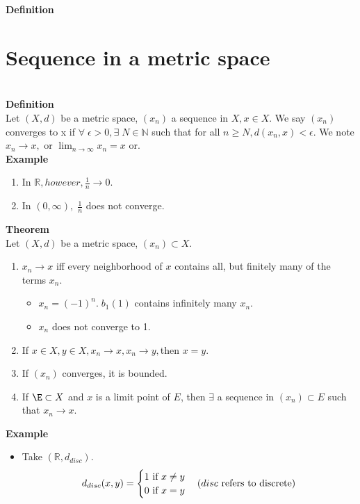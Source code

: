 \documentclass[12pt]{article}
\begin{document}
\begin{block}{\bf Definition}
\newpage
\section{Sequence in a metric space}\\
\textbf{Definition}\\
Let $(X,d)$ be a metric space, $(x_n)$ a sequence in $X, x \in X$. We say $(x_n)$ converges to x if $\forall\;\epsilon > 0, \exists\;N\in \mathbb{N}$ such that  for all $n\ge N, d(x_n,x) < \epsilon$. We note $x_n \rightarrow x,$ or $\lim_{n\rightarrow \infty} x_n = x$ or.\\

\vspace{1\baselineskip}
\textbf{Example}
\begin{enumerate}[label=(\roman*)]
    \item In $\mathbb{R}, however, \frac{1}{n} \rightarrow 0$.
    
    \item In $(0,\infty),\; \frac{1}{n}$ does not converge.
\end{enumerate}
 
\vspace{1\baselineskip}
\textbf{Theorem}\\
 Let $(X,d)$ be a metric space, $(x_n) \subset X.$
 \begin{enumerate}[label=(\roman*)]
     \item  $x_n \rightarrow x$ iff every neighborhood of $x$ contains all, but finitely many of the terms $x_n$.
     \begin{itemize}
         \item $x_n = (-1)^n.\;b_1(1)$ contains infinitely many $x_n$.
         \item $x_n$ does not converge to 1.
     \end{itemize}
     \item If $x\in X, y\in X, x_n \rightarrow x, x_n\rightarrow y, $then $x=y$.
     \item If $(x_n)$ converges, it is bounded.
     \item If $\E \subset X$ and $x$ is a limit point of $E$, then $\exists$ a sequence in $(x_n) \subset E$ such that $x_n \rightarrow x$.
 \end{enumerate}
 
 \vspace{1\baselineskip}
 \textbf{Example}
 \begin{itemize}
     \item Take $(\mathbb{R}, d_{disc}).$
$$
 d_{disc}(x,y) =
 \begin{cases}
 1 \text{ if } x \neq y\\
 0 \text{ if } x = y
 \end{cases}
 \hfill (disc \text{ refers to discrete})$$
 

\end{itemize}
\end{block}
\end{document}
